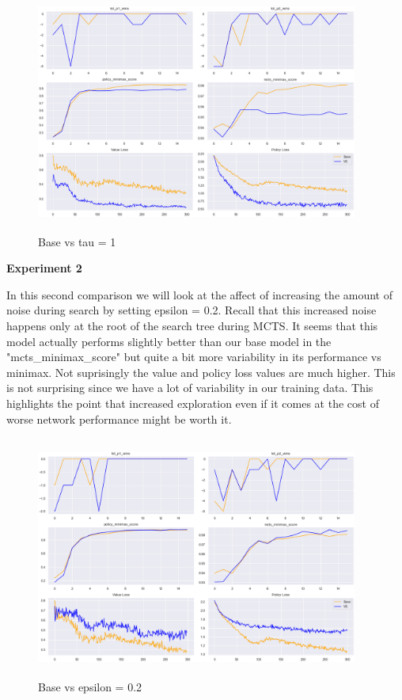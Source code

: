 \begin{figure}[H]
       \centering
       \includegraphics[width=400px,height=300px]{experiments/base_vs_t=2.png}
       \caption{Base vs tau = 1}
       \label{fig:my_label}
\end{figure}




\textbf{Experiment 2}

In this second comparison we will look at the affect of increasing the amount of noise during search by setting epsilon = 0.2. Recall that this increased noise happens only at the root of the search tree during MCTS. It seems that this model actually performs slightly better than our base model in the "mcts\_minimax\_score" but quite a bit more variability in its performance vs minimax. Not suprisingly the value and policy loss values are much higher. This is not surprising since we have a lot of variability in our training data. This highlights the point that increased exploration even if it comes at the cost of worse network performance might be worth it. 

\begin{figure}[H]
       \centering
       \includegraphics[width=400px,height=300px]{experiments/base_vs_eps=0_2.png}
       \caption{Base vs epsilon = 0.2}
       \label{fig:my_label}
\end{figure}



